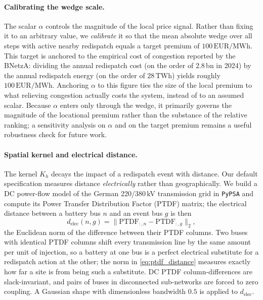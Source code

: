 \paragraph{Calibrating the wedge scale.}
The scalar $\alpha$ controls the magnitude of the local price signal. Rather than fixing it to an arbitrary value, we \emph{calibrate} it so that the mean absolute wedge over all steps with active nearby redispatch equals a target premium of $100\,\text{EUR/MWh}$. This target is anchored to the empirical cost of congestion reported by the BNetzA: dividing the annual redispatch cost (on the order of \EUR$2.8$\,bn in 2024) by the annual redispatch energy (on the order of $28\,\text{TWh}$) yields roughly $100\,\text{EUR/MWh}$. Anchoring $\alpha$ to this figure ties the size of the local premium to what relieving congestion actually costs the system, instead of to an assumed scalar. Because $\alpha$ enters only through the wedge, it primarily governs the magnitude of the locational premium rather than the substance of the relative ranking; a sensitivity analysis on $\alpha$ and on the target premium remains a useful robustness check for future work.

\paragraph{Spatial kernel and electrical distance.}
The kernel $K_h$ decays the impact of a redispatch event with distance. Our default specification measures distance \emph{electrically} rather than geographically. We build a DC power-flow model of the German 220/380\,kV transmission grid in \texttt{PyPSA} and compute its Power Transfer Distribution Factor (PTDF) matrix; the electrical distance between a battery bus $n$ and an event bus $g$ is then
\begin{equation}
\label{eq:ptdf_distance}
d_{\text{elec}}(n, g) = \big\lVert \text{PTDF}_{:,n} - \text{PTDF}_{:,g} \big\rVert_2 ,
\end{equation}
the Euclidean norm of the difference between their PTDF columns. Two buses with identical PTDF columns shift every transmission line by the same amount per unit of injection, so a battery at one bus is a perfect electrical substitute for a redispatch action at the other; the norm in \eqref{eq:ptdf_distance} measures exactly how far a site is from being such a substitute. DC PTDF column-differences are slack-invariant, and pairs of buses in disconnected sub-networks are forced to zero coupling. A Gaussian shape with dimensionless bandwidth $0.5$ is applied to $d_{\text{elec}}$.

